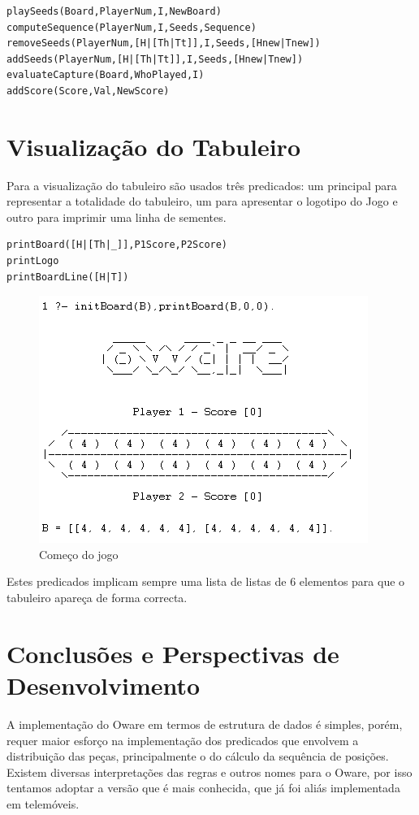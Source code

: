 \documentclass[15pt,a4paper]{article}
\begin{document}
 \begin{verbatim}
playSeeds(Board,PlayerNum,I,NewBoard)
computeSequence(PlayerNum,I,Seeds,Sequence)
removeSeeds(PlayerNum,[H|[Th|Tt]],I,Seeds,[Hnew|Tnew])
addSeeds(PlayerNum,[H|[Th|Tt]],I,Seeds,[Hnew|Tnew])
evaluateCapture(Board,WhoPlayed,I)
addScore(Score,Val,NewScore)
\end{verbatim}


\section{Visualização do Tabuleiro}
Para a visualização do tabuleiro são usados três predicados: um principal para representar a totalidade do tabuleiro, um para apresentar o logotipo do Jogo e outro para imprimir uma linha de sementes.

 \begin{verbatim}
printBoard([H|[Th|_]],P1Score,P2Score)
printLogo
printBoardLine([H|T])
\end{verbatim}

\begin{figure}[h!]
	\begin{center}
	\includegraphics[scale=1]{printBoardExample.png}
	\caption{Começo do jogo}
	\label{fig:Comeco}
	\end{center}
\end{figure}

Estes predicados implicam sempre uma lista de listas de 6 elementos para que o tabuleiro apareça de forma correcta.
\newpage
\section{Conclusões e Perspectivas de Desenvolvimento}
\indent A implementação do Oware em termos de estrutura de dados é simples, porém, 
requer maior esforço na implementação dos predicados que envolvem a distribuição das peças, principalmente o do cálculo da sequência de posições. Existem diversas interpretações das regras e outros nomes para o Oware, por isso tentamos adoptar a versão que é mais conhecida, que já foi aliás implementada em telemóveis.\\
\end{document}
